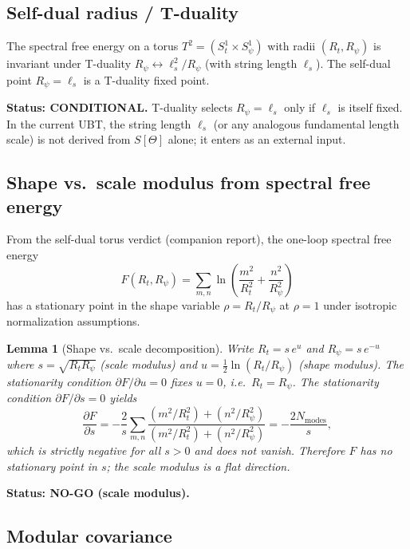 \documentclass[11pt,a4paper]{article}
\newtheorem{lemma}[proposition]{Lemma}
\begin{document}
\subsection{Self-dual radius / T-duality}

The spectral free energy on a torus $T^2=(S^1_t\times S^1_\psi)$ with radii
$(R_t,R_\psi)$ is invariant under T-duality $R_\psi\leftrightarrow \ell_s^2/R_\psi$
(with string length $\ell_s$).  The self-dual point $R_\psi=\ell_s$ is a
T-duality fixed point.

\textbf{Status: CONDITIONAL.}
T-duality selects $R_\psi=\ell_s$ only if $\ell_s$ is itself fixed. In the
current UBT, the string length $\ell_s$ (or any analogous fundamental length
scale) is not derived from $S[\Theta]$ alone; it enters as an external input.

\subsection{Shape vs.\ scale modulus from spectral free energy}

From the self-dual torus verdict (companion report), the one-loop spectral free
energy
\begin{equation}
  F(R_t,R_\psi)=\sum_{m,n}\ln\!\left(
    \frac{m^2}{R_t^2}+\frac{n^2}{R_\psi^2}
  \right)
\end{equation}
has a stationary point in the shape variable $\rho=R_t/R_\psi$ at $\rho=1$
under isotropic normalization assumptions.

\begin{lemma}[Shape vs.\ scale decomposition]
Write $R_t=s\,e^u$ and $R_\psi=s\,e^{-u}$ where $s=\sqrt{R_t R_\psi}$
(scale modulus) and $u=\tfrac12\ln(R_t/R_\psi)$ (shape modulus).
The stationarity condition $\partial F/\partial u=0$ fixes $u=0$, i.e.\
$R_t=R_\psi$.  The stationarity condition $\partial F/\partial s=0$ yields
\begin{equation}
  \frac{\partial F}{\partial s}
  =-\frac{2}{s}\sum_{m,n}\frac{(m^2/R_t^2)+(n^2/R_\psi^2)}{(m^2/R_t^2)+(n^2/R_\psi^2)}
  =-\frac{2N_{\mathrm{modes}}}{s},
\end{equation}
which is strictly negative for all $s>0$ and does not vanish.  Therefore
$F$ has \emph{no} stationary point in $s$; the scale modulus is a flat direction.
\end{lemma}

\textbf{Status: NO-GO (scale modulus).}

\subsection{Modular covariance}
\end{document}
